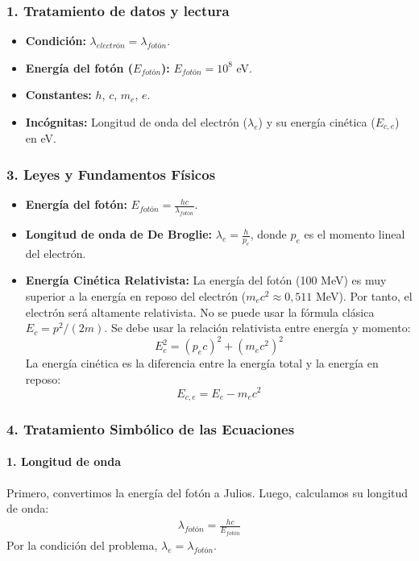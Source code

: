 \subsubsection*{1. Tratamiento de datos y lectura}
\begin{itemize}
    \item \textbf{Condición:} $\lambda_{electrón} = \lambda_{fotón}$.
    \item \textbf{Energía del fotón ($E_{fotón}$):} $E_{fotón} = 10^8$ eV.
    \item \textbf{Constantes:} $h$, $c$, $m_e$, $e$.
    \item \textbf{Incógnitas:} Longitud de onda del electrón ($\lambda_e$) y su energía cinética ($E_{c,e}$) en eV.
\end{itemize}

\subsubsection*{3. Leyes y Fundamentos Físicos}
\begin{itemize}
    \item \textbf{Energía del fotón:} $E_{fotón} = \frac{hc}{\lambda_{fotón}}$.
    \item \textbf{Longitud de onda de De Broglie:} $\lambda_e = \frac{h}{p_e}$, donde $p_e$ es el momento lineal del electrón.
    \item \textbf{Energía Cinética Relativista:} La energía del fotón (100 MeV) es muy superior a la energía en reposo del electrón ($m_e c^2 \approx 0,511$ MeV). Por tanto, el electrón será altamente relativista. No se puede usar la fórmula clásica $E_c=p^2/(2m)$. Se debe usar la relación relativista entre energía y momento:
    $$E_e^2 = (p_e c)^2 + (m_e c^2)^2$$
    La energía cinética es la diferencia entre la energía total y la energía en reposo:
    $$E_{c,e} = E_e - m_e c^2$$
\end{itemize}

\subsubsection*{4. Tratamiento Simbólico de las Ecuaciones}
\paragraph{1. Longitud de onda}
Primero, convertimos la energía del fotón a Julios. Luego, calculamos su longitud de onda:
\begin{gather}
    \lambda_{fotón} = \frac{hc}{E_{fotón}}
\end{gather}
Por la condición del problema, $\lambda_e = \lambda_{fotón}$.
